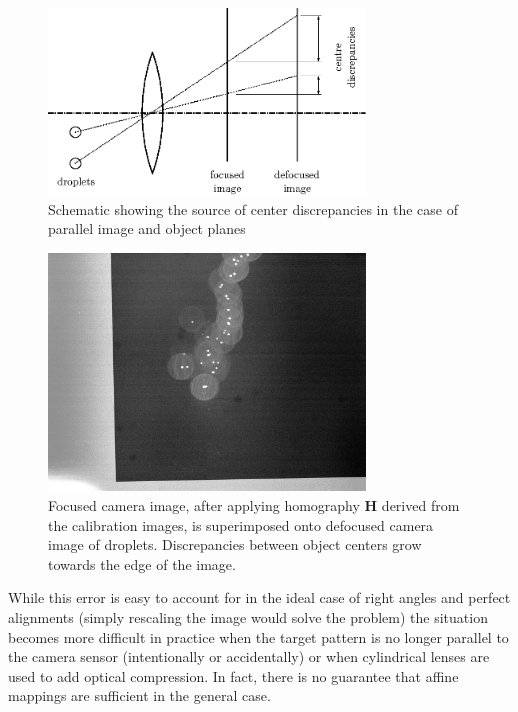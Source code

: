 \documentclass[preprint]{elsarticle}
\begin{document}
\begin{figure}
\centering
\includegraphics[width=0.75\textwidth]{orb_images/discrepancy.eps}
\caption{Schematic showing the source of center discrepancies in the case of
parallel image and object planes \label{fig:discrepancy}}
\end{figure}
\begin{figure}
    \centering
    \includegraphics[width=0.75\textwidth]{orb_images/drop-calibration-off.jpg}
    \caption{Focused camera image, after applying homography $\mathbf{H}$
        derived from the calibration images, is superimposed onto
    defocused camera image of droplets. Discrepancies between object centers
grow towards the edge of the image.}
    \label{fig:drop-calibration-off}
\end{figure}
While this error is easy to account for in the ideal case of right angles and
perfect alignments (simply rescaling the image would solve the problem) the
situation becomes more difficult in practice when the target pattern is no longer
parallel to the camera sensor (intentionally or accidentally) or when
cylindrical lenses are used to add optical compression. In fact, there is no
guarantee that affine mappings are sufficient in the general case.
\end{document}

